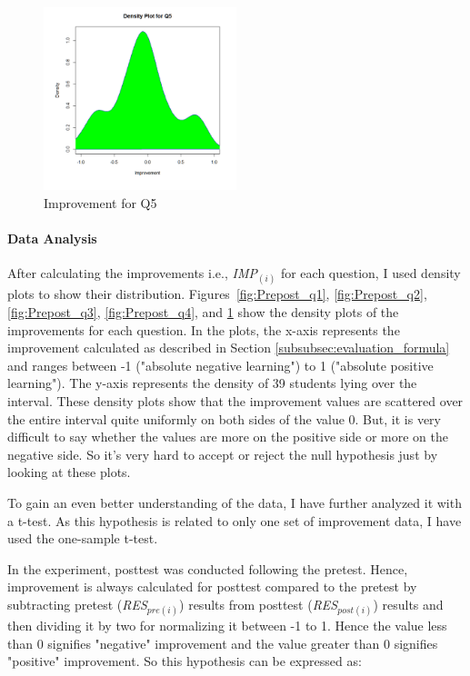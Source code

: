 \begin{figure}
	\centering
	\includegraphics[width=0.5\textwidth]{figures/Prepost_q5}
	\caption{Improvement for Q5}
	\label{fig:Prepost_q5}
\end{figure}

\paragraph{Data Analysis}
After calculating the improvements i.e., \textit{IMP$_{(i)}$} for each question, I used density plots to show their distribution. Figures~\ref{fig:Prepost_q1}, \ref{fig:Prepost_q2}, \ref{fig:Prepost_q3}, \ref{fig:Prepost_q4}, and \ref{fig:Prepost_q5} show the density plots of the improvements for each question. In the plots, the x-axis represents the improvement calculated as described in Section \ref{subsubsec:evaluation_formula} and ranges between -1 ("absolute negative learning") to 1 ("absolute positive learning"). The y-axis represents the density of 39 students lying over the interval. 
These density plots show that the improvement values are scattered over the entire interval quite uniformly on both sides of the value 0. But, it is very difficult to say whether the values are more on the positive side or more on the negative side. So it's very hard to accept or reject the null hypothesis just by looking at these plots.

To gain an even better understanding of the data, I have further analyzed it with a t-test. As this hypothesis is related to only one set of improvement data, I have used the one-sample t-test.   

In the experiment, posttest was conducted following the pretest. Hence, improvement is always calculated for posttest compared to the pretest by subtracting pretest (\textit{RES$_{pre(i)}$}) results from posttest (\textit{RES$_{post(i)}$}) results and then dividing it by two for normalizing it between -1 to 1. Hence the value less than 0 signifies "negative" improvement and the value greater than 0 signifies "positive" improvement. So this hypothesis can be expressed as:   

